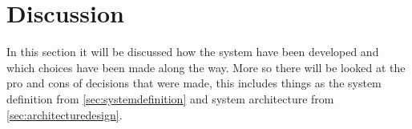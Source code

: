 \chapter{Discussion}
In this section it will be discussed how the system have been developed and which choices have been made along the way.
More so there will be looked at the pro and cons of decisions that were made, this includes things as the system definition from \cref{sec:systemdefinition} and system architecture from \cref{sec:architecturedesign}.











